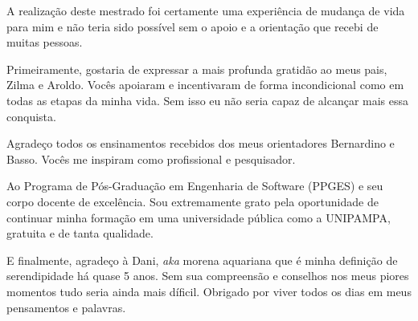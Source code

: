 \begin{agradecimentos}

A realização deste mestrado foi certamente uma experiência de mudança de vida para mim e não teria sido possível sem o apoio e a orientação que recebi de muitas pessoas.

Primeiramente, gostaria de expressar a mais profunda gratidão ao meus pais, Zilma e Aroldo. Vocês apoiaram e incentivaram de forma incondicional como em todas as etapas da minha vida. Sem isso eu não seria capaz de alcançar mais essa conquista.

Agradeço todos os ensinamentos recebidos dos meus orientadores Bernardino e Basso. Vocês me inspiram como profissional e pesquisador.

Ao Programa de Pós-Graduação em Engenharia de Software (PPGES) e seu corpo docente de excelência. 
Sou extremamente grato pela oportunidade de continuar minha formação em uma universidade pública como a UNIPAMPA, gratuita e de tanta qualidade.

E finalmente, agradeço à Dani, \textit{aka} morena aquariana que é minha definição de serendipidade há quase 5 anos. 
Sem sua compreensão e conselhos nos meus piores momentos tudo seria ainda mais díficil.
Obrigado por viver todos os dias em meus pensamentos e palavras.

\end{agradecimentos}